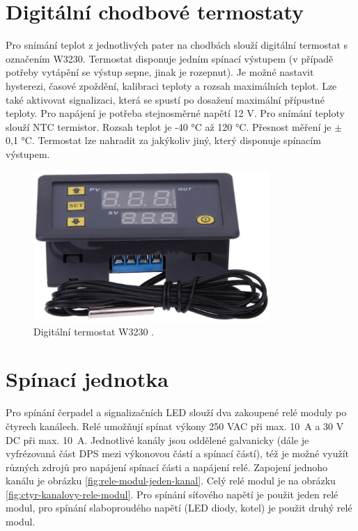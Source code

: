





\section{Digitální chodbové termostaty}
\label{digitalni-chodbove-termostaty}
Pro snímání teplot z jednotlivých pater na chodbách slouží digitální termostat s označením W3230. Termostat disponuje jedním spínací výstupem (v případě potřeby vytápění se výstup sepne, jinak je rozepnut). Je možné nastavit hysterezi, časové zpoždění, kalibraci teploty a rozsah maximálních teplot. Lze také aktivovat signalizaci, která se spustí po dosažení maximální přípustné teploty. Pro napájení je potřeba stejnosměrné napětí 12 V. Pro snímání teploty slouží NTC termistor. Rozsah teplot je -40 °C až 120 °C. Přesnost měření je $\pm$ 0,1 °C. Termostat lze nahradit za jakýkoliv jiný, který disponuje spínacím výstupem.


\begin{figure}[H]
    \centering
    \includegraphics[width=0.8\textwidth]{images/digitalni-termostat-w3230.png}
    \caption[Digitální termostat W3230.]{Digitální termostat W3230 \cite{digitalni-termostat-w3230}.}
    \label{fig:digitalni-termostat-w3230}
\end{figure}


\section{Spínací jednotka}
Pro spínání čerpadel a signalizačních LED slouží dva zakoupené relé moduly po čtyrech kanálech. Relé umožňují spínat výkony 250 VAC při max. 10~A a 30 V DC při max. 10~A. Jednotlivé kanály jsou oddělené galvanicky (dále je vyfrézovaná část DPS mezi výkonovou částí a spínací částí), též je možné využít různých zdrojů pro napájení spínací části a napájení relé. Zapojení jednoho kanálu je obrázku \ref{fig:rele-modul-jeden-kanal}. Celý relé modul je na obrázku \ref{fig:ctyr-kanalovy-rele-modul}. Pro spínání síťového napětí je použit jeden relé modul, pro spínání slaboproudého napětí (LED diody, kotel) je použit druhý relé modul.

